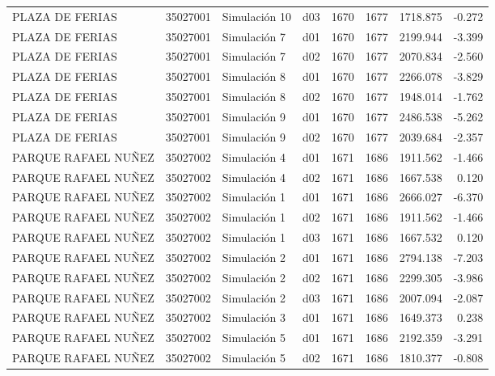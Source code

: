 \begin{landscape}
\begin{longtable}{lrlp{2cm}p{2cm}p{3cm}p{2cm}r}
         PLAZA DE FERIAS &  35027001 &  Simulación 10 &   d03 &      1670 &     1677 &  1718.875 &    -0.272 \\
         PLAZA DE FERIAS &  35027001 &   Simulación 7 &   d01 &      1670 &     1677 &  2199.944 &    -3.399 \\
         PLAZA DE FERIAS &  35027001 &   Simulación 7 &   d02 &      1670 &     1677 &  2070.834 &    -2.560 \\
         PLAZA DE FERIAS &  35027001 &   Simulación 8 &   d01 &      1670 &     1677 &  2266.078 &    -3.829 \\
         PLAZA DE FERIAS &  35027001 &   Simulación 8 &   d02 &      1670 &     1677 &  1948.014 &    -1.762 \\
         PLAZA DE FERIAS &  35027001 &   Simulación 9 &   d01 &      1670 &     1677 &  2486.538 &    -5.262 \\
         PLAZA DE FERIAS &  35027001 &   Simulación 9 &   d02 &      1670 &     1677 &  2039.684 &    -2.357 \\
     PARQUE RAFAEL NUÑEZ &  35027002 &   Simulación 4 &   d01 &      1671 &     1686 &  1911.562 &    -1.466 \\
     PARQUE RAFAEL NUÑEZ &  35027002 &   Simulación 4 &   d02 &      1671 &     1686 &  1667.538 &     0.120 \\
     PARQUE RAFAEL NUÑEZ &  35027002 &   Simulación 1 &   d01 &      1671 &     1686 &  2666.027 &    -6.370 \\
     PARQUE RAFAEL NUÑEZ &  35027002 &   Simulación 1 &   d02 &      1671 &     1686 &  1911.562 &    -1.466 \\
     PARQUE RAFAEL NUÑEZ &  35027002 &   Simulación 1 &   d03 &      1671 &     1686 &  1667.532 &     0.120 \\
     PARQUE RAFAEL NUÑEZ &  35027002 &   Simulación 2 &   d01 &      1671 &     1686 &  2794.138 &    -7.203 \\
     PARQUE RAFAEL NUÑEZ &  35027002 &   Simulación 2 &   d02 &      1671 &     1686 &  2299.305 &    -3.986 \\
     PARQUE RAFAEL NUÑEZ &  35027002 &   Simulación 2 &   d03 &      1671 &     1686 &  2007.094 &    -2.087 \\
     PARQUE RAFAEL NUÑEZ &  35027002 &   Simulación 3 &   d01 &      1671 &     1686 &  1649.373 &     0.238 \\
     PARQUE RAFAEL NUÑEZ &  35027002 &   Simulación 5 &   d01 &      1671 &     1686 &  2192.359 &    -3.291 \\
     PARQUE RAFAEL NUÑEZ &  35027002 &   Simulación 5 &   d02 &      1671 &     1686 &  1810.377 &    -0.808 \\

\end{longtable}
\end{landscape}
